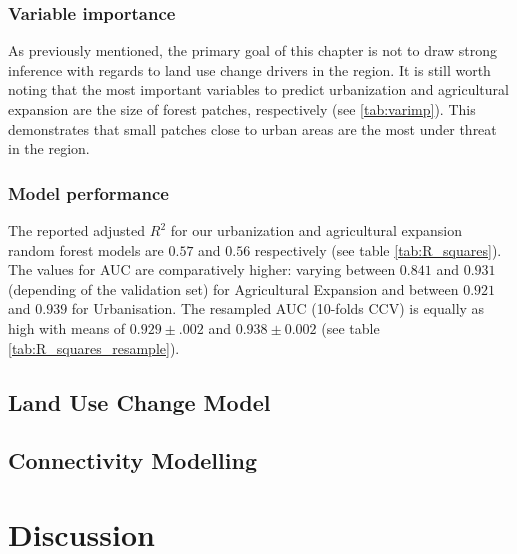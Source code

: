 \subsubsection{Variable importance}

As previously mentioned, the primary goal of this chapter is not to draw strong inference with regards to land use change drivers in the region. It is still worth noting that  the most important variables to predict urbanization and agricultural expansion are the size of forest patches, respectively (see \ref{tab:varimp}). This demonstrates that small patches close to urban areas are the most under threat in the region.  \\

\subsubsection{Model performance}

The reported adjusted  $R^{2}$ for our urbanization and agricultural expansion random forest models are $0.57$ and $0.56$ respectively (see table \ref{tab:R_squares}). The values for AUC are comparatively higher: varying between $0.841$ and $0.931$ (depending of the validation set) for Agricultural Expansion and between $0.921$ and $0.939$ for Urbanisation. The resampled AUC (10-folds CCV) is equally as high with means of $0.929 \pm .002$ and $0.938 \pm 0.002$ (see table \ref{tab:R_squares_resample}).\\ 

\subsection{Land Use Change Model}


\subsection{Connectivity Modelling}


\section{Discussion}


